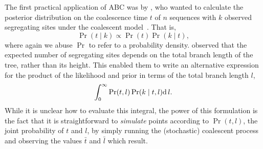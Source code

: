 The first practical application of \gls{ABC} was by
\textcite{tavare1997inferring}, who wanted to calculate the posterior
distribution on the coalescence time $t$ of $n$ sequences with $k$ observed
segregating sites under the coalescent model~\autocite{kingman1982coalescent}.
That is,
\[
  \Pr(t \mid k) \propto \Pr(t) \Pr(k \mid t),
\]
where again we abuse $\Pr$ to refer to a probability density.
\citeauthor{tavare1997inferring} observed that the expected number of
segregating sites depends on the total branch length of the tree, rather than
its height. This enabled them to write an alternative expression for the
product of the likelihood and prior in terms of the total branch length $l$,
\[
  \int_0^\infty \Pr(t, l) \Pr(k \mid t, l) \mathrm{d}\, l.
\]
While it is unclear how to evaluate this integral, the power of this
formulation is the fact that it is straightforward to \emph{simulate} points
according to $\Pr(t, l)$, the joint probability of $t$ and $l$, by simply
running the (stochastic) coalescent process and observing the values $\bar{t}$
and $\bar{l}$ which result.

%
%

